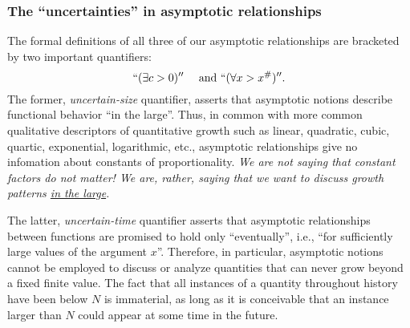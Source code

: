 
\subsubsection{The ``uncertainties'' in asymptotic relationships}

The formal definitions of all three of our asymptotic relationships
are bracketed by two important quantifiers:
\[ ``(\exists c >0)'' \ \ \ \mbox{ and } 
 ``(\forall x > x^{\#})''.
\]
The former, {\em uncertain-size} quantifier, asserts that asymptotic
notions describe functional behavior ``in the large''.  Thus, in
common with more common qualitative descriptors of quantitative growth
such as linear, quadratic, cubic, quartic, exponential, logarithmic,
etc., asymptotic relationships give no infomation about constants of
proportionality.  {\em We are not saying that constant factors do not
  matter!  We are, rather, saying that we want to discuss growth
  patterns \underline{in the large}.}

The latter, {\em uncertain-time} quantifier asserts that asymptotic
relationships between functions are promised to hold only
``eventually'', i.e., ``for sufficiently large values of the argument
$x$''.  Therefore, in particular, asymptotic notions cannot be
employed to discuss or analyze quantities that can never grow beyond a
fixed finite value.  The fact that all instances of a quantity
throughout history have been below $N$ is immaterial, as long as it is
conceivable that an instance larger than $N$ could appear at some time
in the future.

